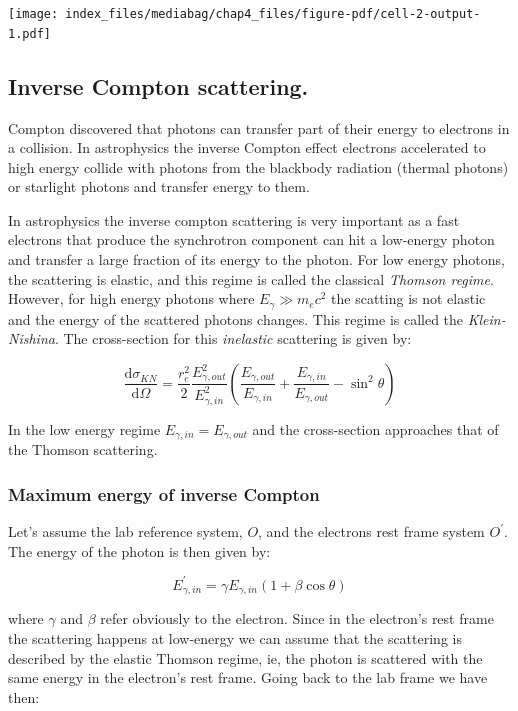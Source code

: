 \documentclass[
  letterpaper,
  DIV=11,
  numbers=noendperiod]{scrreprt}
\begin{document}
\texttt{[image: index\_files/mediabag/chap4\_files/figure-pdf/cell-2-output-1.pdf]}

\subsection{Inverse Compton
scattering.}\label{inverse-compton-scattering.}

Compton discovered that photons can transfer part of their energy to
electrons in a collision. In astrophysics the inverse Compton effect
electrons accelerated to high energy collide with photons from the
blackbody radiation (thermal photons) or starlight photons and transfer
energy to them.

In astrophysics the inverse compton scattering is very important as a
fast electrons that produce the synchrotron component can hit a
low-energy photon and transfer a large fraction of its energy to the
photon. For low energy photons, the scattering is elastic, and this
regime is called the classical \emph{Thomson regime}. However, for high
energy photons where \(E_\gamma \gg m_e c^2\) the scatting is not
elastic and the energy of the scattered photons changes. This regime is
called the \emph{Klein-Nishina}. The cross-section for this
\emph{inelastic} scattering is given by:

\[\frac{\mathrm{ d} \sigma_{KN}}{\mathrm{ d}\Omega} = \frac{r_e^2}{2} \frac{E^2_{\gamma,out}}{E^2_{\gamma,in}}\left(\frac{E_{\gamma,out}}{E_{\gamma,in}} + \frac{E_{\gamma,in}}{E_{\gamma,out}} - \sin^2\theta\right)\]

In the low energy regime \(E_{\gamma,in} = E_{\gamma,out}\) and the
cross-section approaches that of the Thomson scattering.

\subsubsection{Maximum energy of inverse
Compton}\label{maximum-energy-of-inverse-compton}

Let's assume the lab reference system, \(O\), and the electrons rest
frame system \(O^\prime\). The energy of the photon is then given by:

\[E_{\gamma,in}^\prime = \gamma E_{\gamma,in} (1 + \beta \cos\theta)\]

where \(\gamma\) and \(\beta\) refer obviously to the electron. Since in
the electron's rest frame the scattering happens at low-energy we can
assume that the scattering is described by the elastic Thomson regime,
ie, the photon is scattered with the same energy in the electron's rest
frame. Going back to the lab frame we have then:
\end{document}
